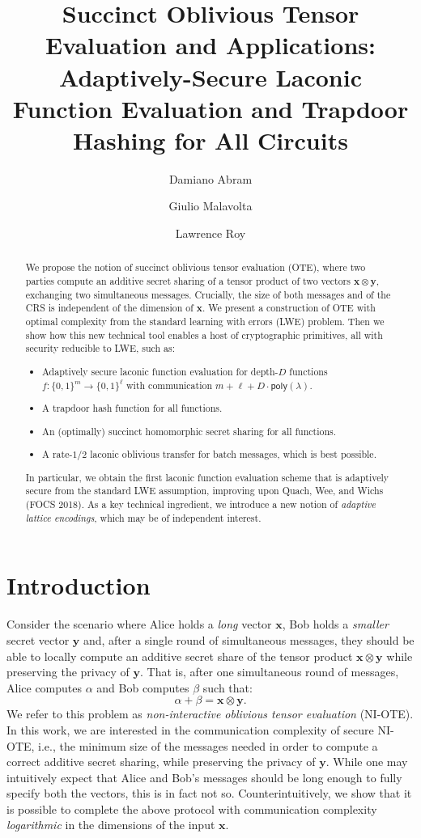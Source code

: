 \documentclass{article}
\author{Damiano Abram \and Giulio Malavolta \and Lawrence Roy}\date{}
\title{Succinct Oblivious Tensor Evaluation and Applications: Adaptively-Secure Laconic Function Evaluation and Trapdoor Hashing for All Circuits}
\newcommand{\poly}{\mathsf{poly}}
\renewcommand{\sec}{\ensuremath{\lambda}}
\begin{document}
\maketitle
\begin{abstract}
    We propose the notion of succinct oblivious tensor evaluation (OTE), where two parties compute an additive secret sharing of a tensor product of two vectors $\mathbf{x} \otimes \mathbf{y}$, exchanging two simultaneous messages. Crucially, the size of both messages and of the CRS is independent of the dimension of $\mathbf{x}$.
    We present a construction of OTE with optimal complexity from the standard learning with errors (LWE) problem. Then we show how this new technical tool enables a host of cryptographic primitives, all with security reducible to LWE, such as:
    \begin{itemize}
        \item Adaptively secure laconic function evaluation for depth-$D$ functions $f:\{0, 1\}^m\rightarrow\{0, 1\}^\ell$ with communication $m+\ell+ D\cdot\poly(\sec)$.
        \item A trapdoor hash function for all functions.
        \item An (optimally) succinct homomorphic secret sharing for all functions.
        \item A rate-$1/2$ laconic oblivious transfer for batch messages, which is best possible.
    \end{itemize}
    In particular, we obtain the first laconic function evaluation scheme that is adaptively secure from the standard LWE assumption, improving upon Quach, Wee, and Wichs (FOCS 2018). 
    As a key technical ingredient, we introduce a new notion of \emph{adaptive lattice encodings}, which may be of independent interest.
\end{abstract}

 


\section{Introduction}


Consider the scenario where Alice holds a \emph{long} vector $\mathbf{x}$, Bob holds a \emph{smaller} secret vector $\mathbf{y}$ and, after a single round of simultaneous messages, they should be able to locally compute an additive secret share of the tensor product $\mathbf{x} \otimes \mathbf{y}$ while preserving the privacy of $\mathbf{y}$. That is, after one simultaneous round of messages, Alice computes $\alpha$ and Bob computes $\beta$ such that:
\[
\alpha + \beta = \mathbf{x}\otimes \mathbf{y}.
\]
We refer to this problem as \emph{non-interactive oblivious tensor evaluation} (NI-OTE). In this work, we are interested in the communication complexity of secure NI-OTE, i.e., the minimum size of the messages needed in order to compute a correct additive secret sharing, while preserving the privacy of $\mathbf{y}$. While one may intuitively expect that Alice and Bob's messages should be long enough to fully specify both the vectors, this is in fact not so. Counterintuitively, we show that it is possible to complete the above protocol with communication complexity \emph{logarithmic} in the dimensions of the input $\mathbf{x}$.
\end{document}
